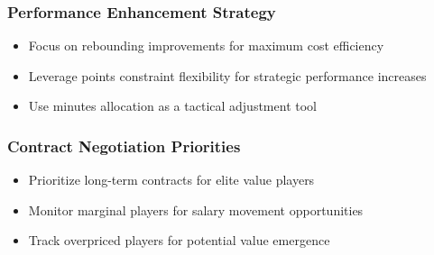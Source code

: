 \documentclass[a4paper,11pt]{article}
\begin{document}
\subsubsection{Performance Enhancement Strategy}
\begin{itemize}
    \item Focus on rebounding improvements for maximum cost efficiency
    \item Leverage points constraint flexibility for strategic performance increases
    \item Use minutes allocation as a tactical adjustment tool
\end{itemize}

\subsubsection{Contract Negotiation Priorities}
\begin{itemize}
    \item Prioritize long-term contracts for elite value players
    \item Monitor marginal players for salary movement opportunities
    \item Track overpriced players for potential value emergence
\end{itemize}
\end{document}
